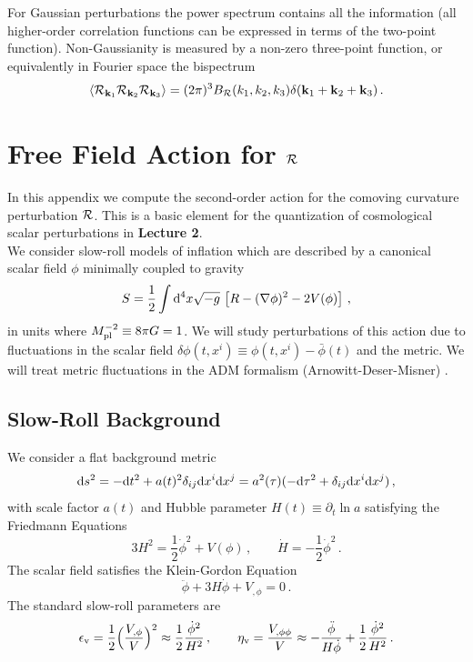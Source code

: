\documentclass[12pt,letterpaper,rotate]{article}
\def\beq{\begin{equation}}
\def\eeq{\end{equation}}
\def\Mp{M_{\rm pl}}
\def\d{{\rm d}}
\def\R{{\cal R}}
\begin{document}
{For Gaussian perturbations the power spectrum contains all the information (all higher-order correlation functions can be expressed in terms of the two-point function).
Non-Gaussianity is measured by a non-zero three-point function, or equivalently in Fourier space the
bispectrum
\beq
\langle \R_{{\bf k}_1} \R_{{\bf k}_2} \R_{{\bf k}_3}\rangle = (2\pi)^3 B_\R(k_1, k_2, k_3) \delta({\bf k}_1 + {\bf k}_2 + {\bf k}_3)\, .
\eeq

\newpage
\section{Free Field Action for $\R$}
\label{sec:malda}

In this appendix we compute the second-order action for the comoving curvature perturbation $\R$.
This is a basic element for the quantization of cosmological scalar perturbations in {\bf Lecture 2}.\\

We consider slow-roll models of inflation which are described by a canonical scalar field $\phi$ minimally coupled to gravity
\beq
\label{equ:SRaction}
S = \frac{1}{2} \int \d^4 x \sqrt{-g}\, \left[R-(\nabla \phi)^2 - 2 V(\phi)
\right]\, , %
\eeq
in units where $\Mp^{-2} \equiv 8 \pi G = 1$.
We will study perturbations of this action due to fluctuations in the scalar field $\delta \phi(t, x^i) \equiv \phi(t, x^i) - \bar \phi(t) $
and the metric. We will treat metric fluctuations in the ADM formalism (Arnowitt-Deser-Misner) \cite{ADM}.


\subsection{Slow-Roll Background}

We consider a flat background metric
\beq
\d s^2 = - \d t^2 + a(t)^2\delta_{ij} \d x^i \d x^j = a^2(\tau) (-\d \tau^2 + \delta_{ij} \d x^i \d x^j) \, ,
\eeq
with scale factor $a(t)$ and Hubble parameter $H(t) \equiv \partial_t \ln a$ satisfying the Friedmann Equations
\beq
3 H^2 = \frac{1}{2} \dot \phi^2 + V(\phi)\, , \qquad 
\dot H = - \frac{1}{2} \dot \phi^2 \, .
\eeq
The scalar field satisfies the Klein-Gordon Equation
\beq
 \ddot \phi + 3 H \dot \phi + V_{,\phi} = 0\, .
\eeq
The standard slow-roll parameters are
\beq
\epsilon_{\rm v} = \frac{1}{2} \Bigl(\frac{V_{, \phi}}{V} \Bigr)^2 \approx \frac{1}{2} \frac{\dot \phi^2}{H^2} \, , \qquad
\eta_{\rm v} = \frac{V_{, \phi \phi}}{V} \approx - \frac{\ddot \phi}{H \dot \phi}  + \frac{1}{2} \frac{\dot \phi^2}{H^2}\, .
\eeq

}
\end{document}
